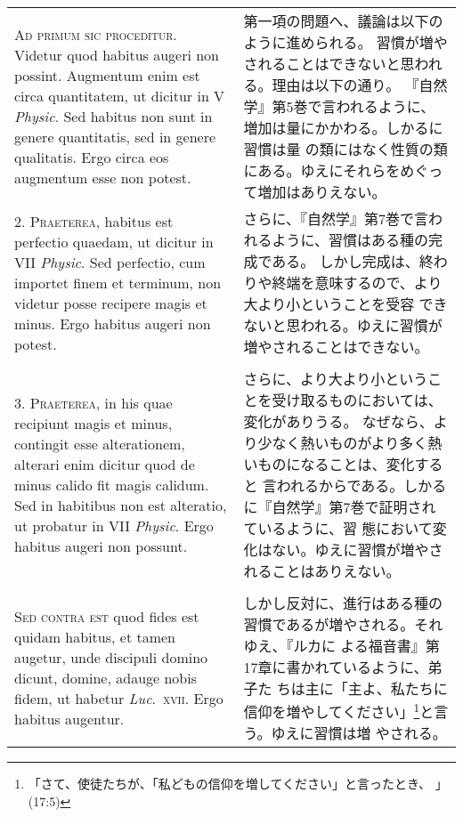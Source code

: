 \documentclass[10pt]{jsarticle} %
\begin{document}
\begin{longtable}{p{21em}p{21em}}

{\scshape Ad primum sic proceditur}. Videtur quod habitus augeri non
possint. Augmentum enim est circa quantitatem, ut dicitur in V
{\itshape Physic}. Sed habitus non sunt in genere quantitatis, sed in genere
qualitatis. Ergo circa eos augmentum esse non potest.

&

第一項の問題へ、議論は以下のように進められる。
習慣が増やされることはできないと思われる。理由は以下の通り。
『自然学』第5巻で言われるように、増加は量にかかわる。しかるに習慣は量
 の類にはなく性質の類にある。ゆえにそれらをめぐって増加はありえない。

\\


2. {\scshape Praeterea}, habitus est perfectio quaedam, ut dicitur in VII
{\itshape Physic}. Sed perfectio, cum importet finem et terminum, non videtur
posse recipere magis et minus. Ergo habitus augeri non potest.

&

さらに、『自然学』第7巻で言われるように、習慣はある種の完成である。
しかし完成は、終わりや終端を意味するので、より大より小ということを受容
 できないと思われる。ゆえに習慣が増やされることはできない。

\\\\


3. {\scshape Praeterea}, in his quae recipiunt magis et minus, contingit esse
alterationem, alterari enim dicitur quod de minus calido fit magis
calidum. Sed in habitibus non est alteratio, ut probatur in VII
{\itshape Physic}. Ergo habitus augeri non possunt.

&

さらに、より大より小ということを受け取るものにおいては、変化がありうる。
なぜなら、より少なく熱いものがより多く熱いものになることは、変化すると
言われるからである。しかるに『自然学』第7巻で証明されているように、習
態において変化はない。ゆえに習慣が増やされることはありえない。

\\\\


{\scshape Sed contra est} quod fides est quidam habitus, et tamen augetur, unde
discipuli domino dicunt, domine, adauge nobis fidem, ut habetur
{\itshape Luc}.~{\scshape xvii}. Ergo habitus augentur.

&

しかし反対に、進行はある種の習慣であるが増やされる。それゆえ、『ルカに
よる福音書』第17章に書かれているように、弟子た
ちは主に「主よ、私たちに信仰を増やしてください」\footnote{「さて、使徒たちが、「私どもの信仰を増してください」と言ったとき、 」(17:5)}と言う。ゆえに習慣は増
やされる。


\end{longtable}
\end{document}
